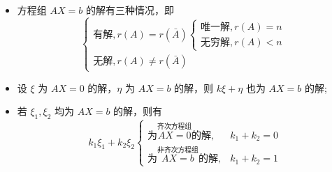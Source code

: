 \begin{itemize}
    \item 方程组 $ AX = b $ 的解有三种情况，即
    \begin{equation*}
        \left\{
        \begin{array}{l}
            \textrm{有解},r(A) = r(\bar A) 
            \left\{
            \begin{array}{l}
                \textrm{唯一解},r(A) = n \\
                \textrm{无穷解},r(A) < n 
            \end{array}
            \right.
            \\
            \textrm{无解}, r(A)\neq r(\bar A)
        \end{array}
        \right.
    \end{equation*}
    \item 设 $ \xi $ 为 $ AX = 0 $ 的解，$ \eta $ 为 $ AX = b $ 的解，则
    $ k\xi + \eta $ 也为 $ AX = b $ 的解;
    \item 若 $ \xi_1,\xi_2 $ 均为 $ AX = b $ 的解，则有
    $$
        k_1\xi_1+k_2\xi_2 
        \begin{cases}
            \textrm{为} \overset{\textrm{齐次方程组}}{AX = 0}\textrm{的解},& k_1+k_2 = 0\\ 
            \textrm{为} \overset{\textrm{非齐次方程组}}{AX = b}\textrm{的解},& k_1+k_2 = 1
        \end{cases}
    $$ 
\end{itemize}

